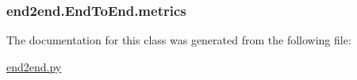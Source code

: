 \subsubsection[{metrics}]{\setlength{\rightskip}{0pt plus 5cm}end2end.\+End\+To\+End.\+metrics}\label{classend2end_1_1_end_to_end_aaa7b9811ffa4d76a9c373081f8049054}


The documentation for this class was generated from the following file\+:\begin{DoxyCompactItemize}
\item 
\hyperlink{end2end_8py}{end2end.\+py}\end{DoxyCompactItemize}
